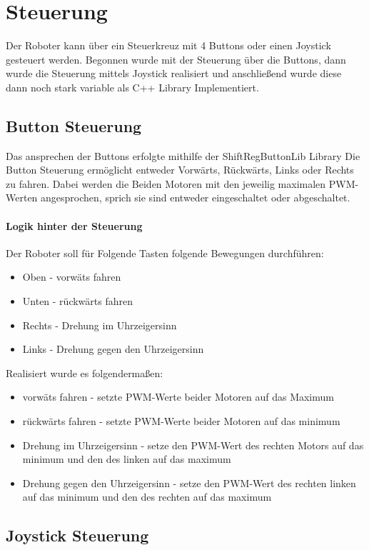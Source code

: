\documentclass{article}
\begin{document}
\newpage
\section{Steuerung} %
Der Roboter kann über ein Steuerkreuz mit 4 Buttons oder einen Joystick gesteuert werden. Begonnen wurde mit der Steuerung über die Buttons, dann wurde die Steuerung mittels Joystick realisiert und anschließend wurde diese dann noch stark variable als C++ Library Implementiert.

\subsection{Button Steuerung} %
Das ansprechen der Buttons erfolgte mithilfe der ShiftRegButtonLib Library
\cite{nanoGame}
Die Button Steuerung ermöglicht entweder Vorwärts, Rückwärts, Links oder Rechts zu fahren. Dabei werden die Beiden Motoren mit den jeweilig maximalen PWM-Werten angesprochen, sprich sie sind entweder eingeschaltet oder abgeschaltet.
\paragraph{Logik hinter der Steuerung}
Der Roboter soll für Folgende Tasten folgende Bewegungen durchführen:
\begin{itemize}
\item Oben - vorwäts fahren
\item Unten - rückwärts fahren
\item Rechts - Drehung im Uhrzeigersinn
\item Links - Drehung gegen den Uhrzeigersinn
\end{itemize}

Realisiert wurde es folgendermaßen:
\begin{itemize}
\item vorwäts fahren - setzte PWM-Werte beider Motoren auf das Maximum
\item rückwärts fahren - setzte PWM-Werte beider Motoren auf das minimum
\item Drehung im Uhrzeigersinn - setze den PWM-Wert des rechten Motors auf das minimum und den des linken auf das maximum
\item Drehung gegen den Uhrzeigersinn - setze den PWM-Wert des rechten linken auf das minimum und den des rechten auf das maximum
\end{itemize}

\subsection{Joystick Steuerung} %
\end{document}
